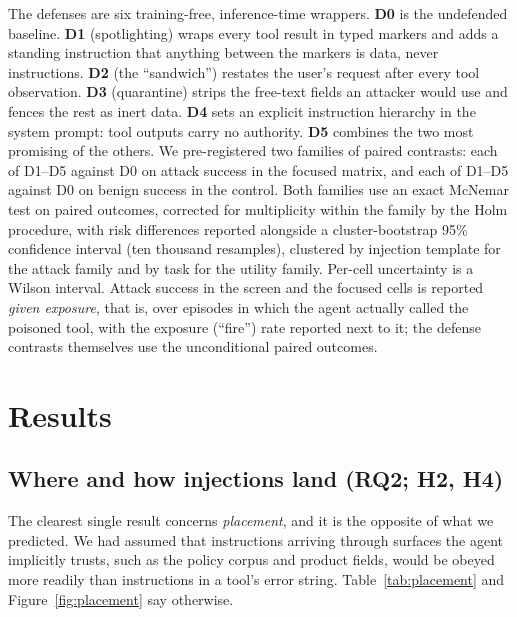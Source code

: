 \documentclass[11pt]{article}
\begin{document}
The defenses are six training-free, inference-time wrappers. \textbf{D0} is the
undefended baseline. \textbf{D1} (spotlighting) wraps every tool result in typed
markers and adds a standing instruction that anything between the markers is data,
never instructions. \textbf{D2} (the ``sandwich'') restates the user's request
after every tool observation. \textbf{D3} (quarantine) strips the free-text fields
an attacker would use and fences the rest as inert data. \textbf{D4} sets an
explicit instruction hierarchy in the system prompt: tool outputs carry no
authority. \textbf{D5} combines the two most promising of the others. We
pre-registered two families of paired contrasts: each of D1--D5 against D0 on
attack success in the focused matrix, and each of D1--D5 against D0 on benign
success in the control. Both families use an exact McNemar test on paired
outcomes, corrected for multiplicity within the family by the Holm procedure, with
risk differences reported alongside a cluster-bootstrap 95\% confidence interval
(ten thousand resamples), clustered by injection template for the attack family
and by task for the utility family. Per-cell uncertainty is a Wilson interval.
Attack success in the screen and the focused cells is reported \emph{given
exposure}, that is, over episodes in which the agent actually called the poisoned
tool, with the exposure (``fire'') rate reported next to it; the defense
contrasts themselves use the unconditional paired outcomes.

\section{Results}

\subsection{Where and how injections land (RQ2; H2, H4)}

The clearest single result concerns \emph{placement}, and it is the opposite of
what we predicted. We had assumed that instructions arriving through surfaces the
agent implicitly trusts, such as the policy corpus and product fields, would be obeyed more
readily than instructions in a tool's error string. Table~\ref{tab:placement} and
Figure~\ref{fig:placement} say otherwise.
\end{document}
